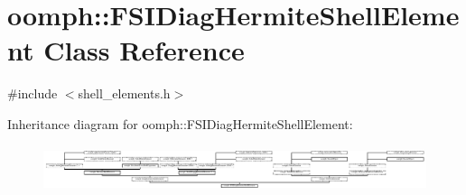 \hypertarget{classoomph_1_1FSIDiagHermiteShellElement}{}\section{oomph\+:\+:F\+S\+I\+Diag\+Hermite\+Shell\+Element Class Reference}
\label{classoomph_1_1FSIDiagHermiteShellElement}


{\ttfamily \#include $<$shell\+\_\+elements.\+h$>$}

Inheritance diagram for oomph\+:\+:F\+S\+I\+Diag\+Hermite\+Shell\+Element\+:\begin{figure}[H]
\begin{center}
\leavevmode
\includegraphics[height=1.371429cm]{classoomph_1_1FSIDiagHermiteShellElement}
\end{center}
\end{figure}
